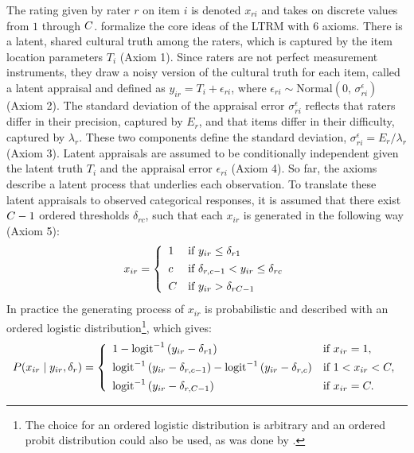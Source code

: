 \documentclass{article}
\newcommand{\Irater}{r}
\newcommand{\Iitem}{i}
\newcommand{\Incat}{c}
\newcommand{\Tncat}{\expandafter\MakeUppercase\expandafter{\Incat}}
\newcommand{\ilogit}[1]{\text{logit}^{-1}\left(#1\right)}
\newcommand{\dnorm}[2]{\text{Normal}\left(#1,\,#2\right)}
\begin{document}
The rating given by rater $\Irater$ on item $\Iitem$ is denoted $x_{\Irater\Iitem}$ and takes on discrete values from $1$ through $\Tncat$.  formalize the core ideas of the LTRM with 6 axioms. There is a latent, shared cultural truth among the raters, which is captured by the item location parameters $T_\Iitem$ (Axiom 1). Since raters are not perfect measurement instruments, they draw a noisy version of the cultural truth for each item, called a latent appraisal and defined as $y_{\Iitem\Irater} = T_\Iitem + \epsilon_{\Irater\Iitem}$, where $\epsilon_{\Irater\Iitem}\sim \dnorm{0}{\sigma^\epsilon_{\Irater\Iitem}}$ (Axiom 2). The standard deviation of the appraisal error $\sigma^\epsilon_{\Irater\Iitem}$ reflects that raters differ in their precision, captured by $E_\Irater$, and that items differ in their difficulty, captured by $\lambda_\Irater$. These two components define the standard deviation, $\sigma^\epsilon_{\Irater\Iitem} = E_\Irater / \lambda_\Irater$ (Axiom 3). Latent appraisals are assumed to be conditionally independent given the latent truth $T_\Iitem$ and the appraisal error $\epsilon_{\Irater\Iitem}$ (Axiom 4). So far, the axioms describe a latent process that underlies each observation. To translate these latent appraisals to observed categorical responses, it is assumed that there exist $\Tncat - 1$ ordered thresholds $\delta_{\Irater\Incat}$, such that each $x_{\Iitem\Irater}$ is generated in the following way (Axiom 5):
\begin{align*}
	x_{\Iitem\Irater} = 
	\left\{\begin{array}{ll} 
	1		& \text{if } y_{\Iitem\Irater} \leq \delta_{\Irater 1} \\[4pt]
	\Incat	& \text{if } \delta_{\Irater, \Incat-1} < y_{\Iitem\Irater} \leq \delta_{\Irater\Incat} \\[4pt]
	\Tncat	& \text{if } y_{\Iitem\Irater} > \delta_{\Irater \Tncat-1}
	\end{array} \right.
\end{align*}
In practice the generating process of $x_{\Iitem\Irater}$ is probabilistic and described with an ordered logistic distribution\footnote{The choice for an ordered logistic distribution is arbitrary and an ordered probit distribution could also be used, as was done by .}, which gives:
\begin{align*}
P(x_{\Iitem\Irater}\mid y_{\Iitem\Irater},\delta_{\Irater}) = 
\left\{\begin{array}{ll} 
1 - \ilogit{y_{\Iitem\Irater} - \delta_{\Irater 1}}         & \text{if } x_{\Iitem\Irater} = 1, \\[4pt]
\ilogit{y_{\Iitem\Irater} - \delta_{\Irater,\Incat-1}} - 
\ilogit{y_{\Iitem\Irater} - \delta_{\Irater,\Incat}}         & \text{if } 1 < x_{\Iitem\Irater} < \Tncat,\\[4pt]
\ilogit{y_{\Iitem\Irater} - \delta_{\Irater,\Tncat-1}}       & \text{if } x_{\Iitem\Irater} = \Tncat. 
\end{array} \right.
\end{align*}
\end{document}
